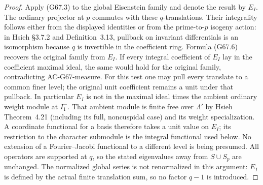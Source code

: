 \begin{proof}
Apply (G67.3) to the global Eisenstein family and denote the
result by $E_I$.  The ordinary projector at $p$ commutes with
these $q$-translations.  Their integrality follows either
from the displayed identities or from the prime-to-$p$
isogeny action: in Hsieh \S3.7.2 and Definition~3.13, pullback
on invariant differentials is an isomorphism because $q$ is
invertible in the coefficient ring.  Formula (G67.6) recovers
the original family from $E_I$.  If every integral coefficient
of $E_I$ lay in the coefficient maximal ideal, the same would
hold for the original family, contradicting AC-G67-measure.
For this test one may pull every translate to a common finer
level; the original unit coefficient remains a unit under
that pullback.  In particular $E_I$ is not in the maximal
ideal times the ambient ordinary weight module at $I_1^-$.
That ambient module is finite free over $\Lambda'$ by
Hsieh Theorem~4.21 (including its full, noncuspidal case) and
its weight specialization.  A coordinate
functional for a basis therefore takes a unit value on $E_I$;
its restriction to the character submodule is the integral
functional used below.  No extension of a Fourier--Jacobi
functional to a different level is being presumed.
All operators are supported at $q$, so the stated eigenvalues
away from $S\cup S_p$ are unchanged.  The normalized global
series is not renormalized in this argument: $E_I$ is defined
by the actual finite translation sum, so no factor $q-1$ is
introduced.
\end{proof}

